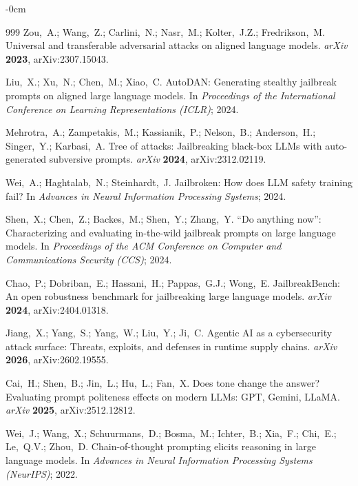 \documentclass[ai,article,submit,pdftex,moreauthors]{Definitions/mdpi}
\begin{document}
\begin{adjustwidth}{-\extralength}{0cm}
{\begin{thebibliography}{999}
Zou,~A.; Wang,~Z.; Carlini,~N.; Nasr,~M.; Kolter,~J.Z.; Fredrikson,~M.
Universal and transferable adversarial attacks on aligned language models.
{\em arXiv} {\bf 2023}, arXiv:2307.15043.

Liu,~X.; Xu,~N.; Chen,~M.; Xiao,~C.
{AutoDAN}: Generating stealthy jailbreak prompts on aligned large language models.
In {\em Proceedings of the International Conference on Learning Representations (ICLR)}; 2024.

Mehrotra,~A.; Zampetakis,~M.; Kassianik,~P.; Nelson,~B.; Anderson,~H.; Singer,~Y.; Karbasi,~A.
Tree of attacks: Jailbreaking black-box {LLMs} with auto-generated subversive prompts.
{\em arXiv} {\bf 2024}, arXiv:2312.02119.

Wei,~A.; Haghtalab,~N.; Steinhardt,~J.
Jailbroken: How does {LLM} safety training fail?
In {\em Advances in Neural Information Processing Systems}; 2024.

Shen,~X.; Chen,~Z.; Backes,~M.; Shen,~Y.; Zhang,~Y.
``{D}o anything now'': Characterizing and evaluating in-the-wild jailbreak prompts on large language models.
In {\em Proceedings of the ACM Conference on Computer and Communications Security (CCS)}; 2024.

Chao,~P.; Dobriban,~E.; Hassani,~H.; Pappas,~G.J.; Wong,~E.
{JailbreakBench}: An open robustness benchmark for jailbreaking large language models.
{\em arXiv} {\bf 2024}, arXiv:2404.01318.

Jiang,~X.; Yang,~S.; Yang,~W.; Liu,~Y.; Ji,~C.
Agentic {AI} as a cybersecurity attack surface: Threats, exploits, and defenses in runtime supply chains.
{\em arXiv} {\bf 2026}, arXiv:2602.19555.

Cai,~H.; Shen,~B.; Jin,~L.; Hu,~L.; Fan,~X.
Does tone change the answer? {E}valuating prompt politeness effects on modern {LLMs}: {GPT}, {Gemini}, {LLaMA}.
{\em arXiv} {\bf 2025}, arXiv:2512.12812.

Wei,~J.; Wang,~X.; Schuurmans,~D.; Bosma,~M.; Ichter,~B.; Xia,~F.; Chi,~E.; Le,~Q.V.; Zhou,~D.
Chain-of-thought prompting elicits reasoning in large language models.
In {\em Advances in Neural Information Processing Systems (NeurIPS)}; 2022.


\end{thebibliography}}
\end{adjustwidth}
\end{document}
